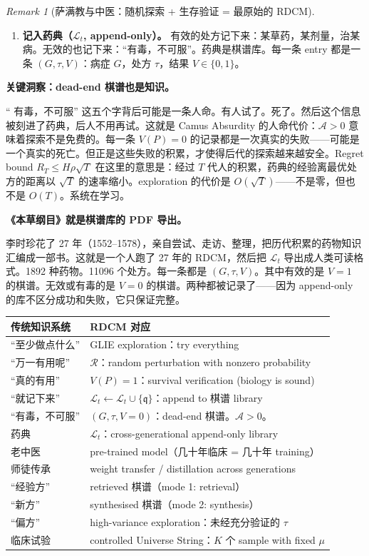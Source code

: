 \documentclass[11pt,a4paper]{article}
\theoremstyle{definition}
\theoremstyle{remark}
\newtheorem{remark}[theorem]{Remark}
\begin{document}
\begin{remark}[萨满教与中医：随机探索 + 生存验证 = 最原始的 RDCM]
\begin{enumerate}[nosep]
  \item {\color{violet!70!black} \textbf{记入药典（$\mathcal{L}_t$, append-only）。}} 有效的处方记下来：某草药，某剂量，治某病。无效的也记下来：``有毒，不可服''。药典是棋谱库。每一条 entry 都是一条 $(G, \tau, V)$：病症 $G$，处方 $\tau$，结果 $V \in \{0,1\}$。
\end{enumerate}

{\color{magenta!70!black} \textbf{关键洞察：dead-end 棋谱也是知识。}}

``{\color{magenta!70!black} 有毒，不可服}'' 这五个字背后可能是一条人命。有人试了。死了。然后这个信息被刻进了药典，后人不用再试。这就是 Camus Absurdity 的人命代价：$\mathcal{A} > 0$ 意味着探索不是免费的。每一条 $V(P) = 0$ 的记录都是一次真实的失败——可能是一个真实的死亡。但正是这些失败的积累，才使得后代的探索越来越安全。Regret bound $R_T \leq H\rho\sqrt{T}$ 在这里的意思是：经过 $T$ 代人的积累，药典的经验离最优处方的距离以 $\sqrt{T}$ 的速率缩小。exploration 的代价是 $O(\sqrt{T})$——不是零，但也不是 $O(T)$。系统在学习。

{\color{cyan!70!black} \textbf{《本草纲目》就是棋谱库的 PDF 导出。}}

李时珍花了 27 年（1552--1578），亲自尝试、走访、整理，把历代积累的药物知识汇编成一部书。这就是一个人跑了 27 年的 RDCM，然后把 $\mathcal{L}_t$ 导出成人类可读格式。1892 种药物。11096 个处方。每一条都是 $(G, \tau, V)$。其中有效的是 $V = 1$ 的棋谱。无效或有毒的是 $V = 0$ 的棋谱。两种都被记录了——因为 append-only 的库不区分成功和失败，它只保证完整。

\begin{center}
\small
\begin{tabularx}{\textwidth}{l X}
\toprule
\textbf{传统知识系统} & \textbf{RDCM 对应} \\
\midrule
``至少做点什么'' & GLIE exploration：try everything \\
``万一有用呢'' & $\mathcal{R}$：random perturbation with nonzero probability \\
``真的有用'' & $V(P) = 1$：survival verification (biology is sound) \\
``就记下来'' & $\mathcal{L}_t \leftarrow \mathcal{L}_t \cup \{\mathfrak{q}\}$：append to 棋谱 library \\
``有毒，不可服'' & $(G, \tau, V{=}0)$：dead-end 棋谱。$\mathcal{A} > 0$。 \\
药典 & $\mathcal{L}_t$：cross-generational append-only library \\
老中医 & pre-trained model（几十年临床 = 几十年 training） \\
师徒传承 & weight transfer / distillation across generations \\
``经验方'' & retrieved 棋谱（mode 1: retrieval） \\
``新方'' & synthesised 棋谱（mode 2: synthesis） \\
``偏方'' & high-variance exploration：未经充分验证的 $\tau$ \\
临床试验 & controlled Universe String：$K$ 个 sample with fixed $\mu$ \\
\bottomrule
\end{tabularx}
\end{center}


\end{remark}
\end{document}
